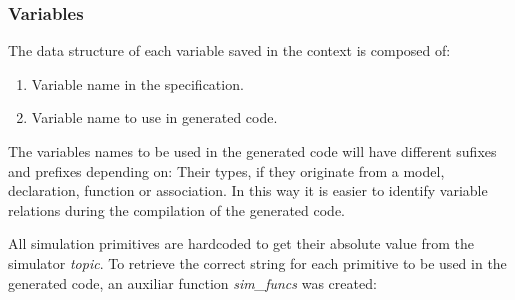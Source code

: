 \subsubsection{Variables}
\label{sssec:compileVars}

The data structure of each variable saved in the context is composed of:

\begin{enumerate}
    \item Variable name in the specification.
    \item Variable name to use in generated code.
\end{enumerate}

The variables names to be used in the generated code will have different sufixes and prefixes depending on: Their types, if they originate from a model, declaration, function or association. In this way it is easier to identify variable relations during the compilation of the generated code.

All simulation primitives are hardcoded to get their absolute value from the simulator \textit{topic}.
To retrieve the correct string for each primitive to be used in the generated code, an auxiliar function \textit{sim\_funcs} was created:

